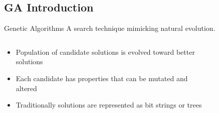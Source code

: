 \subsection{GA Introduction}
\begin{frame}{Genetic Algorithms}
A search technique mimicking natural evolution.
\begin{columns}[onlytextwidth]
  \begin{column}{0.45\textwidth}
    \small
    \begin{itemize}
      \item Population of candidate solutions is evolved toward better solutions
      \item Each candidate has properties that can be mutated and altered
      \item Traditionally solutions are represented as bit strings or trees
    \end{itemize}
    \end{column}
  \begin{column}{0.45\textwidth}
    \begin{figure}
		\tiny
		\begin{algorithmic}
        \ENDFOR
        \ENDFOR
      \ENDWHILE
    \end{algorithmic}
    \end{figure}
  \end{column}
\end{columns}
\end{frame}
